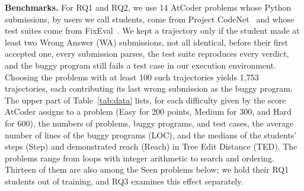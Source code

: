\documentclass[conference]{IEEEtran}
\begin{document}
\noindent\textbf{Benchmarks.} For RQ1 and RQ2, we use 14 AtCoder problems whose Python submissions, by users we call students, come from Project CodeNet~\cite{puri2021codenet} and whose test suites come from FixEval~\cite{haque2023fixeval}. We kept a trajectory only if the student made at least two Wrong Answer (WA) submissions, not all identical, before their first accepted one, every submission parses, the test suite reproduces every verdict, and the buggy program still fails a test case in our execution environment. Choosing the problems with at least 100 such trajectories yields 1,753 trajectories, each contributing its last wrong submission as the buggy program. The upper part of Table~\ref{tab:data} lists, for each difficulty given by the score AtCoder assigns to a problem (Easy for 200 points, Medium for 300, and Hard for 600), the numbers of problems, buggy programs, and test cases, the average number of lines of the buggy programs (LOC), and the medians of the students' steps (Step) and demonstrated reach (Reach) in Tree Edit Distance (TED). The problems range from loops with integer arithmetic to search and ordering. Thirteen of them are also among the Seen problems below; we hold their RQ1 students out of training, and RQ3 examines this effect separately.
\end{document}
